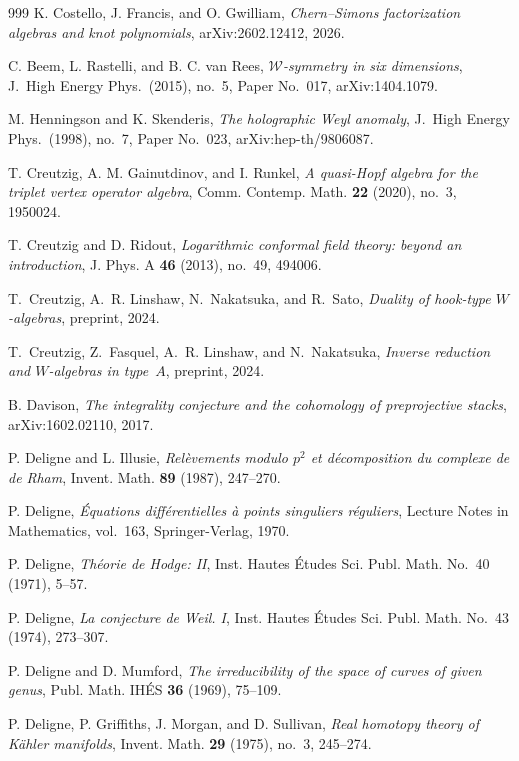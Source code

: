 \begin{thebibliography}{999}
K. Costello, J. Francis, and O. Gwilliam, \emph{Chern--Simons factorization algebras and knot polynomials}, arXiv:2602.12412, 2026.

C. Beem, L. Rastelli, and B. C. van Rees, \emph{$\mathcal{W}$-symmetry in six dimensions}, J.\ High Energy Phys.\ (2015), no.~5, Paper No.~017, arXiv:1404.1079.

M. Henningson and K. Skenderis, \emph{The holographic Weyl anomaly}, J.\ High Energy Phys.\ (1998), no.~7, Paper No.~023, arXiv:hep-th/9806087.

T. Creutzig, A. M. Gainutdinov, and I. Runkel, \emph{A quasi-Hopf algebra for the triplet vertex operator algebra}, Comm. Contemp. Math. \textbf{22} (2020), no.~3, 1950024.

T. Creutzig and D. Ridout, \emph{Logarithmic conformal field theory: beyond an introduction}, J. Phys. A \textbf{46} (2013), no.~49, 494006.

T.~Creutzig, A.~R. Linshaw, N.~Nakatsuka, and R.~Sato, \emph{Duality of hook-type $W$-algebras}, preprint, 2024.

T.~Creutzig, Z.~Fasquel, A.~R. Linshaw, and N.~Nakatsuka, \emph{Inverse reduction and $W$-algebras in type~$A$}, preprint, 2024.

B. Davison, \emph{The integrality conjecture and the cohomology of preprojective stacks}, arXiv:1602.02110, 2017.

P. Deligne and L. Illusie, \emph{Rel\`evements modulo $p^2$ et d\'ecomposition du complexe de de Rham}, Invent. Math. \textbf{89} (1987), 247--270.

P. Deligne, \emph{\'Equations diff\'erentielles \`a points singuliers r\'eguliers}, Lecture Notes in Mathematics, vol.~163, Springer-Verlag, 1970.

P. Deligne, \emph{Th\'eorie de Hodge: II}, Inst. Hautes \'Etudes Sci. Publ. Math. No.~40 (1971), 5--57.

P. Deligne, \emph{La conjecture de Weil. I}, Inst. Hautes \'Etudes Sci. Publ. Math. No.~43 (1974), 273--307.

P. Deligne and D. Mumford, \emph{The irreducibility of the space of curves of given genus}, Publ. Math. IH\'ES \textbf{36} (1969), 75--109.

P. Deligne, P. Griffiths, J. Morgan, and D. Sullivan, \emph{Real homotopy theory of K\"ahler manifolds}, Invent. Math. \textbf{29} (1975), no.~3, 245--274.


\end{thebibliography}
